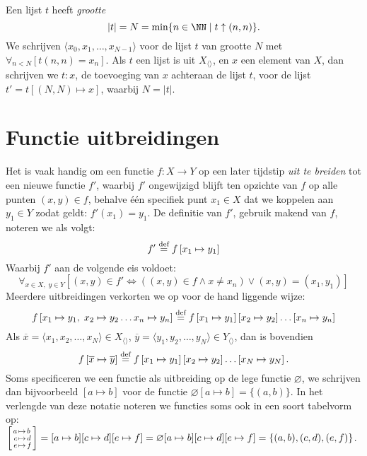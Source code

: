 Een lijst $t$ heeft \emph{grootte}
%
\begin{equation*}
  |t| = N = \min\{n\in\NN \mid t \uparrow (n, n)\}.
\end{equation*}
%
We schrijven $\langle x_0, x_1, \dots, x_{N-1}\rangle$ voor de lijst $t$ van grootte $N$ met $\forall_{n < N}[t(n, n) = x_n]$.
Als $t$ een lijst is uit $X_{\langle\rangle}$, en $x$ een element van $X$, dan schrijven we $t:x$, de toevoeging van $x$ achteraan de lijst $t$, voor de lijst $t' = t[(N, N) \mapsto x]$, waarbij $N = |t|$.

\section{Functie uitbreidingen}
\label{sec:uitbreiden}

Het is vaak handig om een functie $f : X \to Y$ op een later tijdstip \emph{uit te breiden} tot een nieuwe functie $f'$, waarbij $f'$ ongewijzigd blijft ten opzichte van $f$ op alle punten $(x, y) \in f$, behalve één specifiek punt $x_1 \in X$ dat we koppelen aan $y_1 \in Y$ zodat geldt: $f'(x_1) = y_1$. De definitie van $f'$, gebruik makend van $f$, noteren we als volgt:
%
\begin{equation*}
  f' \DEF f \left[ x_1 \mapsto y_1 \right]
\end{equation*}
%
Waarbij $f'$ aan de volgende eis voldoet:
%
\begin{equation*}
  \forall_{x \in X,\; y \in Y} \left[ (x, y) \in f' \Leftrightarrow \left( (x, y) \in f \land x \neq x_n \right) \lor (x, y) = (x_1, y_1) \right]
\end{equation*}
%
Meerdere uitbreidingen verkorten we op voor de hand liggende wijze:
%
\begin{equation*}
  f \left[ x_1 \mapsto y_1,\; x_2 \mapsto y_2 \dots x_n \mapsto y_n \right]
  \DEF
  f \left[ x_1 \mapsto y_1 \right]
    \left[ x_2 \mapsto y_2 \right]\dots
    \left[ x_n \mapsto y_n \right]
\end{equation*}
%
Als $\overline{x} = \langle x_1, x_2, \dots, x_N\rangle \in X_{\langle\rangle}$, $\overline{y} = \langle y_1, y_2, \dots, y_N\rangle \in Y_{\langle\rangle}$, dan is bovendien
%
\begin{equation*}
  f \left[ \overline{x} \mapsto \overline{y} \right] \DEF
  f \left[ x_1 \mapsto y_1 \right]
    \left[ x_2 \mapsto y_2 \right]\dots
    \left[ x_N \mapsto y_N \right].
\end{equation*}
%
Soms specificeren we een functie als uitbreiding op de lege functie $\varnothing$, we schrijven dan bijvoorbeeld $[a \mapsto b]$ voor de functie $\varnothing[a \mapsto b] = \{(a, b)\}$. In het verlengde van deze notatie noteren we functies soms ook in een soort tabelvorm op: $\left[\Bindings{
  a & b \\
  c & d \\
  e & f
}\right] = [a \mapsto b][c \mapsto d][e \mapsto f] = \varnothing[a \mapsto b][c \mapsto d][e \mapsto f] = \{(a, b), (c, d), (e, f)\}$.

